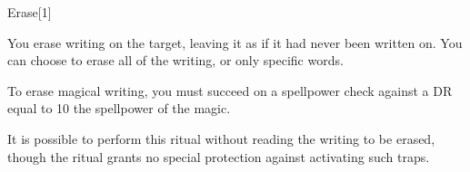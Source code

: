\begin{spellsection}{Erase}[1]
    \begin{spellheader}
    \end{spellheader}
    \begin{spellcontent}
        \begin{spelltargetinginfo}
        \end{spelltargetinginfo}
        \begin{spelleffects}
            \spelleffect You erase writing on the target, leaving it as if it had never been written on. You can choose to erase all of the writing, or only specific words.

            To erase magical writing, you must succeed on a spellpower check against a DR equal to 10 \add the spellpower of the magic.
        \end{spelleffects}
    \end{spellcontent}
    \begin{spellfooter}
        \spellnotes It is possible to perform this ritual without reading the writing to be erased, though the ritual grants no special protection against activating such traps.
    \end{spellfooter}
\end{spellsection}

